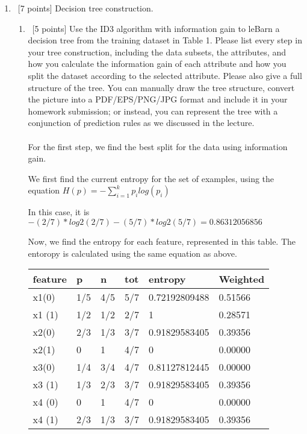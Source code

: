 \documentclass[12pt, fullpage,letterpaper]{article}
\begin{document}
\begin{enumerate}
\item~[7 points] Decision tree construction. 
\begin{enumerate}
\item~[5 points] Use the ID3 algorithm with information gain to leBarn a decision tree from the training dataset in Table 1. Please list every step in your tree construction, including the data subsets, the attributes, and how you calculate the information gain of each attribute and how you split the dataset according to the selected attribute. Please also give a full structure of the tree. You can manually  draw the tree structure,  convert the picture into a PDF/EPS/PNG/JPG format and include it in your homework submission; or instead, you can  represent the tree with a conjunction of prediction rules as we discussed in the lecture. 
\\\\
For the first step, we find the best split for the data using information gain. 

We first find the current entropy for the set of examples, using the equation $H(p)=-\sum^k_{i=1}p_ilog(p_i)$

In this case, it is $-(2/7)*log2(2/7)-(5/7)*log2(5/7)=0.86312056856$

Now, we find the entropy for each feature, represented in this table. The entoropy is calculated using the same equation as above.

\begin{tabular}{|l|l|l|l|l|l|}
	\hline
	feature & p   & n   & tot & entropy       & Weighted \\ \hline
	x1(0)   & 1/5 & 4/5 & 5/7 & 0.72192809488 & 0.51566  \\ \hline
	x1 (1)  & 1/2 & 1/2 & 2/7 & 1             & 0.28571  \\ \hline
	x2(0)   & 2/3 & 1/3 & 3/7 & 0.91829583405 & 0.39356  \\ \hline
	x2(1)   & 0   & 1   & 4/7 & 0             & 0.00000  \\ \hline
	x3(0)   & 1/4 & 3/4 & 4/7 & 0.81127812445 & 0.00000  \\ \hline
	x3 (1)  & 1/3 & 2/3 & 3/7 & 0.91829583405 & 0.39356  \\ \hline
	x4 (0)  & 0   & 1   & 4/7 & 0             & 0.00000  \\ \hline
	x4 (1)  & 2/3 & 1/3 & 3/7 & 0.91829583405 & 0.39356  \\ \hline
	\end{tabular}


\end{enumerate}
\end{enumerate}
\end{document}
